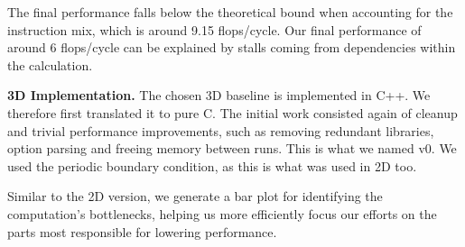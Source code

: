 \documentclass[letterpaper]{article}
\newcommand{\mypar}[1]{{\bf #1.}}
\begin{document}
The final performance falls below the theoretical bound when accounting for the instruction mix, which is around 9.15 flops/cycle.
Our final performance of around 6 flops/cycle can be explained by stalls coming from dependencies within the calculation.

\mypar{3D Implementation} The chosen 3D baseline is implemented in C++. We therefore first translated it to pure C. The initial work consisted again of cleanup and trivial performance improvements, such as removing redundant libraries, option parsing and freeing memory between runs. This is what we named v0. We used the periodic boundary condition, as this is what was used in 2D too.

Similar to the 2D version, we generate a bar plot for identifying the computation's bottlenecks, helping us more efficiently focus our efforts on the parts most responsible for lowering performance.
\end{document}
